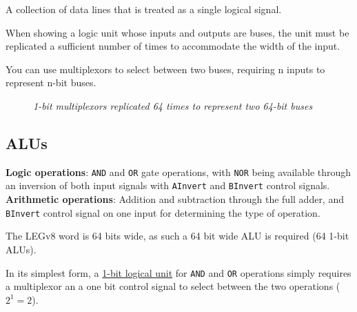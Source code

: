 \documentclass[11pt]{article}
\begin{document}
A collection of data lines that is treated as a single logical signal.

When showing a logic unit whose inputs and outputs are buses, the unit must be replicated a sufficient number of times to accommodate the width of the input.

You can use multiplexors to select between two buses, requiring n inputs to represent n-bit buses.

\begin{figure}[htbp]
    \centering
    \caption{\textit{1-bit multiplexors replicated 64 times to represent two 64-bit buses}}
\end{figure}

\subsection*{ALUs}

\begin{tcolorbox}[
    enhanced,
    attach boxed title to top left={xshift=6mm,yshift=-1.5mm},
    colback=moonstoneblue!20,
    colframe=moonstoneblue,
    colbacktitle=moonstoneblue,
    title=Operation done by the ALU,
    fonttitle=\bfseries\color{white},
    boxed title style={size=small,colframe=moonstoneblue,sharp corners},
    sharp corners,
]
    {\color{moondark}\textbf{Logic operations}}: \texttt{AND} and \texttt{OR} gate operations, with \texttt{NOR} being available through an inversion of both input signals with \texttt{AInvert} and \texttt{BInvert} control signals. \\
    {\color{moondark}\textbf{Arithmetic operations}}: Addition and subtraction through the full adder, and \texttt{BInvert} control signal on one input for determining the type of operation.
\end{tcolorbox}

The LEGv8 word is 64 bits wide, as such a 64 bit wide ALU is required (64 1-bit ALUs).

In its simplest form, a \underline{1-bit logical unit} for \texttt{AND} and \texttt{OR} operations simply requires a multiplexor an a one bit control signal to select between the two operations ($2^1=2$).
\end{document}

